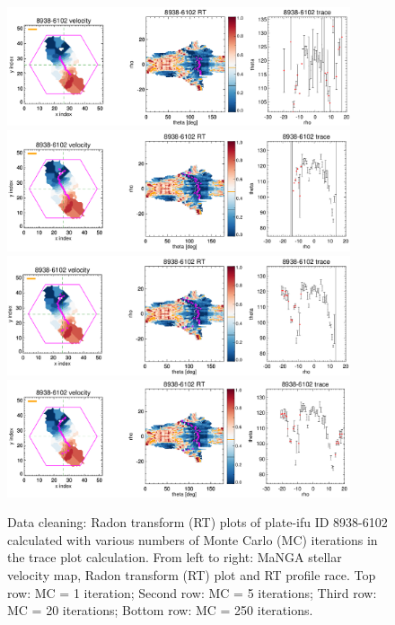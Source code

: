 \documentclass[fleqn,usenatbib]{mnras}
\begin{document}
\begin{figure}
    \centering
     \includegraphics[width=0.9\textwidth]{Images/SN+MC_ITER/8938-6102-3-1.png}
     \includegraphics[width=0.9\textwidth]{Images/SN+MC_ITER/8938-6102-3-5.png}
    \includegraphics[width=0.9\textwidth]{Images/SN+MC_ITER/8938-6102-3-20.png}
    \includegraphics[width=0.9\textwidth]{Images/SN+MC_ITER/8938-6102-3-250.png}
    \caption{Data cleaning: Radon transform (RT) plots of plate-ifu ID 8938-6102 calculated with various numbers of Monte Carlo (MC) iterations in the trace plot calculation. From left to right: MaNGA stellar velocity map, Radon transform (RT) plot and RT profile race. Top row: MC = 1 iteration; Second row: MC = 5 iterations; Third row: MC = 20 iterations; Bottom row: MC = 250 iterations.}
    \label{fig:MC-iterations}
\end{figure}
\end{document}

